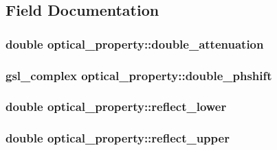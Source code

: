 \subsection{Field Documentation}
\hypertarget{structoptical__property_a558bb1c84d5da44820be51660781cc57}{
\subsubsection[{double\_\-attenuation}]{\setlength{\rightskip}{0pt plus 5cm}double {\bf optical\_\-property::double\_\-attenuation}}}
\label{structoptical__property_a558bb1c84d5da44820be51660781cc57}
\hypertarget{structoptical__property_a541278c1aa9254d59a00530bb188df61}{
\subsubsection[{double\_\-phshift}]{\setlength{\rightskip}{0pt plus 5cm}gsl\_\-complex {\bf optical\_\-property::double\_\-phshift}}}
\label{structoptical__property_a541278c1aa9254d59a00530bb188df61}
\hypertarget{structoptical__property_abf81db5da1e05a9f72d6baed4dea69e4}{
\subsubsection[{reflect\_\-lower}]{\setlength{\rightskip}{0pt plus 5cm}double {\bf optical\_\-property::reflect\_\-lower}}}
\label{structoptical__property_abf81db5da1e05a9f72d6baed4dea69e4}
\hypertarget{structoptical__property_a1c483ffff6b6392a5200798f1d74077c}{
\subsubsection[{reflect\_\-upper}]{\setlength{\rightskip}{0pt plus 5cm}double {\bf optical\_\-property::reflect\_\-upper}}}
\label{structoptical__property_a1c483ffff6b6392a5200798f1d74077c}
